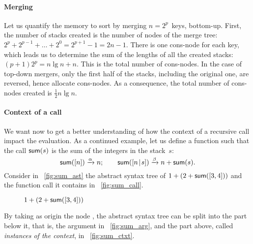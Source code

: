 \paragraph{Merging}

Let us quantify the memory to sort by merging \(n=2^p\)~keys,
bottom\hyp{}up. First, the number of stacks created is the number of
nodes of the merge tree: \(2^p + 2^{p-1} + \ldots + 2^0 = 2^{p+1}-1 =
2n - 1\). There is one cons\hyp{}node for each key,
which leads us to determine the sum of the lengths of all the created
stacks: \((p+1)2^p = n\lg n + n\). This is the total number of
cons\hyp{}nodes. In the case of top\hyp{}down
mergers, only the first half of the stacks, including the original
one, are reversed, hence allocate cons\hyp{}nodes. As a consequence,
the total number of cons\hyp{}nodes created is \(\tfrac{1}{2}n\lg n\).

\paragraph{Context of a call}

We want now to get a better understanding of how the context of a
recursive call impact the evaluation. As a continued example, let us
define a function  such that the call \(\textsf{sum}(s)\) is
the sum of the integers in the stack~\(s\):
\begin{equation*}
\textsf{sum}([n]) \xrightarrow{\smash{\alpha}} n;\qquad
\textsf{sum}([{n}\!\mid\!{s}]) \xrightarrow{\smash{\beta}} n + \textsf{sum}(s).
\end{equation*}
Consider in \fig~\vref{fig:sum_ast} the abstract syntax tree of
\(1+(2+\textsf{sum}([3,4]))\) and the function call it contains in
\fig~\ref{fig:sum_call}.
\begin{figure}[b]
\centering
{}
\qquad
{}
\quad
{}
\qquad
{}
\caption{\(1+(2+\textsf{sum}([3,4]))\)}
\end{figure}
By taking as origin the node , the abstract syntax tree can
be split into the part below it, that is, the argument in
\fig~\ref{fig:sum_arg}, and the part above, called \emph{instances of
  the context}, in \fig~\ref{fig:sum_ctxt}.

